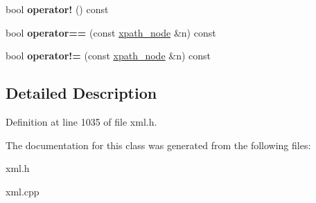 \begin{DoxyCompactItemize}
\item 
\hypertarget{classphys_1_1xml_1_1xpath__node_adaf2965c9efbe1690a4b4feda88f153d}{
bool {\bfseries operator!} () const }
\label{d3/d5a/classphys_1_1xml_1_1xpath__node_adaf2965c9efbe1690a4b4feda88f153d}

\item 
\hypertarget{classphys_1_1xml_1_1xpath__node_aece2f21210be813f1acb58827e35ed78}{
bool {\bfseries operator==} (const \hyperlink{classphys_1_1xml_1_1xpath__node}{xpath\_\-node} \&n) const }
\label{d3/d5a/classphys_1_1xml_1_1xpath__node_aece2f21210be813f1acb58827e35ed78}

\item 
\hypertarget{classphys_1_1xml_1_1xpath__node_aee14528f0686476a8c34b5d780e53a4a}{
bool {\bfseries operator!=} (const \hyperlink{classphys_1_1xml_1_1xpath__node}{xpath\_\-node} \&n) const }
\label{d3/d5a/classphys_1_1xml_1_1xpath__node_aee14528f0686476a8c34b5d780e53a4a}

\end{DoxyCompactItemize}


\subsection{Detailed Description}


Definition at line 1035 of file xml.h.



The documentation for this class was generated from the following files:\begin{DoxyCompactItemize}
\item 
xml.h\item 
xml.cpp\end{DoxyCompactItemize}
